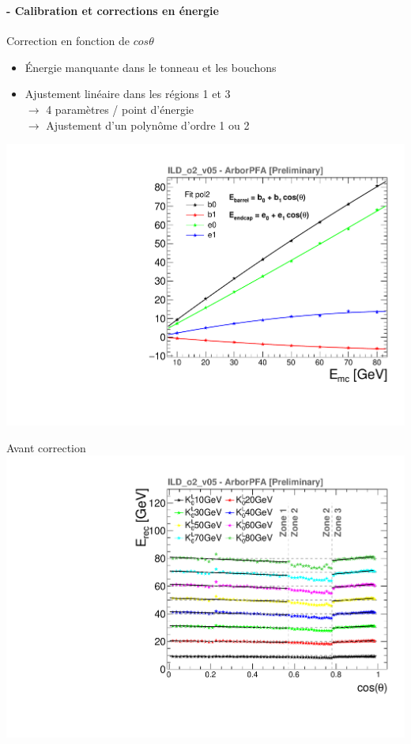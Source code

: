 \documentclass[8pt]{beamer}
\begin{document}
  \begin{frame}
  \frametitle{\secname}
  \framesubtitle{\subsecname - Calibration et corrections en énergie}
    \begin{minipage}{0.53\linewidth}
      \begin{block}{Correction en fonction de $cos\theta$}
        \begin{itemize}
          \item Énergie manquante dans le tonneau et les bouchons
          \item Ajustement linéaire dans les régions 1 et 3 \\
          $\rightarrow$ 4 paramètres / point d'énergie \\
          $\rightarrow$ Ajustement d'un polynôme d'ordre 1 ou 2
        \end{itemize}
      \end{block}
      \begin{center}
          \includegraphics[width=0.8\linewidth]{ThetaCalibFit_pol2_thesis.pdf}
      \end{center}
    \end{minipage} \hfill
    \begin{minipage}{0.46\linewidth}
      \begin{center}
        Avant correction \\ \includegraphics[width=0.75\linewidth]{ERecLinGap_fits_thesis.pdf} \\

\end{center}
\end{minipage}
\end{frame}
\end{document}
